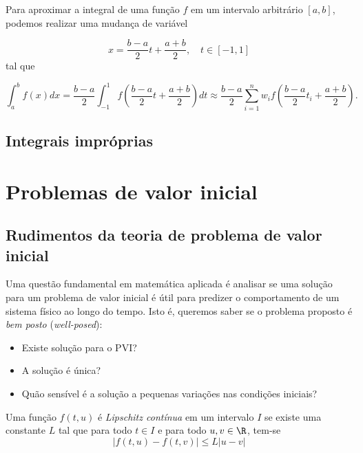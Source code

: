 \documentclass{article}
\begin{document}
Para aproximar a integral de uma função \(f\) em um intervalo arbitrário \([a, b]\), podemos realizar uma mudança de variável

\begin{equation}
    x = \frac{b-a}{2} t + \frac{a+b}{2}, \quad t \in [-1, 1]
\end{equation}
tal que

\begin{equation}
    \int_{a}^{b} f(x) dx = \frac{b-a}{2} \int_{-1}^{1} f\left(\frac{b-a}{2} t + \frac{a+b}{2}\right) dt \approx \frac{b-a}{2} \sum_{i=1}^{n} w_i f\left(\frac{b-a}{2} t_i + \frac{a+b}{2}\right).
\end{equation}


\subsection{Integrais impróprias}

\section{Problemas de valor inicial}

\subsection{Rudimentos da teoria de problema de valor inicial}

Uma questão fundamental em matemática aplicada é analisar se uma solução para um problema de valor inicial é útil para predizer o comportamento de um sistema físico ao longo do tempo. Isto é, queremos saber se o problema proposto é \emph{bem posto} (\emph{well-posed}):
\begin{itemize}
    \item Existe solução para o PVI?
    \item A solução é única?
    \item Quão sensível é a solução a pequenas variações nas condições iniciais?
\end{itemize}

\begin{defn}
    Uma função \(f(t,u)\) é \emph{Lipschitz contínua} em um intervalo \(I\) se existe uma constante \(L\) tal que para todo \(t \in I\) e para todo \(u, v \in \R\), tem-se
    \begin{equation}
        \vert f(t,u) - f(t,v) \vert \leq L \vert u - v \vert
    \end{equation}
\end{defn}
\end{document}
